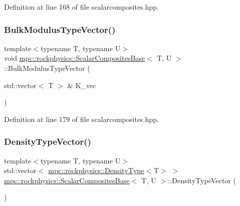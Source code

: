 Definition at line 168 of file scalarcomposites.\+hpp.

\mbox{\label{classmpc_1_1rockphysics_1_1_scalar_composites_base_a8b2c81765221042743e393e3a02153f3}} 
\subsubsection{\texorpdfstring{Bulk\+Modulus\+Type\+Vector()}{BulkModulusTypeVector()}\hspace{0.1cm}{\footnotesize\ttfamily [3/3]}}
{\footnotesize\ttfamily template$<$typename T, typename U$>$ \\
void \mbox{\hyperlink{classmpc_1_1rockphysics_1_1_scalar_composites_base}{mpc\+::rockphysics\+::\+Scalar\+Composites\+Base}}$<$ T, U $>$\+::Bulk\+Modulus\+Type\+Vector (\begin{DoxyParamCaption}\item[{std\+::vector$<$ T $>$ \&}]{K\+\_\+vec }\end{DoxyParamCaption})\hspace{0.3cm}{\ttfamily [inline]}}



Definition at line 179 of file scalarcomposites.\+hpp.

\mbox{\label{classmpc_1_1rockphysics_1_1_scalar_composites_base_a93d459f2440b68c970864abd93e3934a}} 
\subsubsection{\texorpdfstring{Density\+Type\+Vector()}{DensityTypeVector()}\hspace{0.1cm}{\footnotesize\ttfamily [1/3]}}
{\footnotesize\ttfamily template$<$typename T, typename U$>$ \\
std\+::vector$<$ \mbox{\hyperlink{structmpc_1_1rockphysics_1_1_density_type}{mpc\+::rockphysics\+::\+Density\+Type}}$<$T$>$ $>$ \mbox{\hyperlink{classmpc_1_1rockphysics_1_1_scalar_composites_base}{mpc\+::rockphysics\+::\+Scalar\+Composites\+Base}}$<$ T, U $>$\+::Density\+Type\+Vector (\begin{DoxyParamCaption}{ }\end{DoxyParamCaption})\hspace{0.3cm}{\ttfamily [inline]}}



